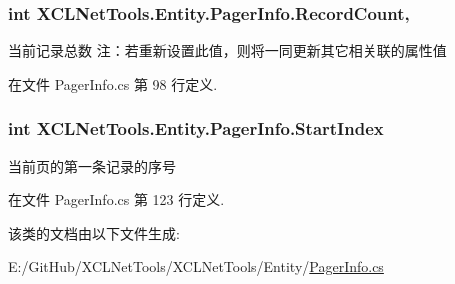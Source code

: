 \subsubsection[{\texorpdfstring{Record\+Count}{RecordCount}}]{\setlength{\rightskip}{0pt plus 5cm}int X\+C\+L\+Net\+Tools.\+Entity.\+Pager\+Info.\+Record\+Count\hspace{0.3cm}{\ttfamily [get]}, {\ttfamily [set]}}\hypertarget{class_x_c_l_net_tools_1_1_entity_1_1_pager_info_a5617d4aaafa80fa664f13cfe7fbc1a6c}{}\label{class_x_c_l_net_tools_1_1_entity_1_1_pager_info_a5617d4aaafa80fa664f13cfe7fbc1a6c}


当前记录总数 注：若重新设置此值，则将一同更新其它相关联的属性值 



在文件 Pager\+Info.\+cs 第 98 行定义.

\subsubsection[{\texorpdfstring{Start\+Index}{StartIndex}}]{\setlength{\rightskip}{0pt plus 5cm}int X\+C\+L\+Net\+Tools.\+Entity.\+Pager\+Info.\+Start\+Index\hspace{0.3cm}{\ttfamily [get]}}\hypertarget{class_x_c_l_net_tools_1_1_entity_1_1_pager_info_a659b36bf635a3fed41ee3b82ec4c2cbe}{}\label{class_x_c_l_net_tools_1_1_entity_1_1_pager_info_a659b36bf635a3fed41ee3b82ec4c2cbe}


当前页的第一条记录的序号 



在文件 Pager\+Info.\+cs 第 123 行定义.



该类的文档由以下文件生成\+:\begin{DoxyCompactItemize}
\item 
E\+:/\+Git\+Hub/\+X\+C\+L\+Net\+Tools/\+X\+C\+L\+Net\+Tools/\+Entity/\hyperlink{_pager_info_8cs}{Pager\+Info.\+cs}\end{DoxyCompactItemize}
